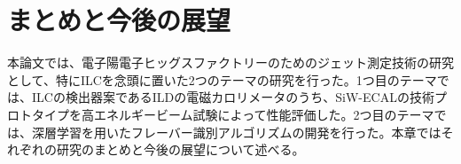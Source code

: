 
\chapter{まとめと今後の展望} \label{sec:Conclusion}
本論文では、電子陽電子ヒッグスファクトリーのためのジェット測定技術の研究として、特にILCを念頭に置いた2つのテーマの研究を行った。1つ目のテーマでは、ILCの検出器案であるILDの電磁カロリメータのうち、SiW-ECALの技術プロトタイプを高エネルギービーム試験によって性能評価した。2つ目のテーマでは、深層学習を用いたフレーバー識別アルゴリズムの開発を行った。本章ではそれぞれの研究のまとめと今後の展望について述べる。

